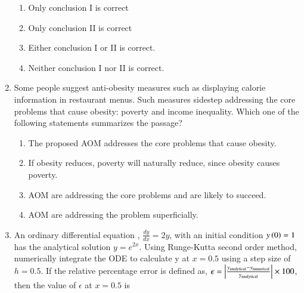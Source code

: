 \documentclass[journal,12pt,onecolumn]{IEEEtran}
\theoremstyle{remark}
\begin{document}
\begin{enumerate}
		\hfill{}
		
		\begin{enumerate}
			\item Only conclusion I is correct
			\item Only conclusion II is correct
			\item Either conclusion I or II is correct.
			\item Neither conclusion I nor II is correct.
		\end{enumerate}
		
		\item Some people suggest anti-obesity measures  such as displaying calorie information in restaurant menus. Such measures sidestep addressing the core problems that cause obesity: poverty and income inequality. Which one of the following statements summarizes the passage?
		
		\hfill{}
		
		\begin{enumerate}
			\item The proposed AOM addresses the core problems that cause obesity.
			\item If obesity reduces, poverty will naturally reduce, since obesity causes poverty.
			\item AOM are addressing the core problems and are likely to succeed.
			\item AOM are addressing the problem superficially.
		\end{enumerate}
		
		\item An ordinary differential equation , $\frac{dy}{dx}=2y$, with an initial condition $y\left(0\right)=1$ has the analytical solution $y=e^{2x}$. Using Runge-Kutta second order method, numerically integrate the ODE to calculate y at $x=0.5$ using a step size of $h=0.5$. If the relative percentage error is defined as, $\epsilon=\left\vert\frac{y_{\text{analytical}}-y_{\text{numerical}}}{y_{\text{analytical}}}\right\vert\times100$, then the value of $\epsilon$ at $x=0.5$ is
		
		\hfill{}
		
		\begin{enumerate}
		\end{enumerate}
		

\end{enumerate}
\end{document}
